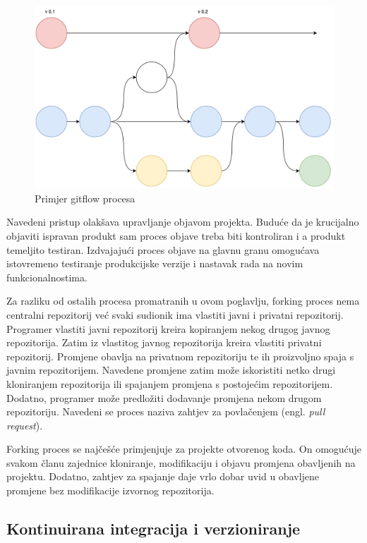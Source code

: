 \documentclass[times, utf8, diplomski, numeric]{fer}
\newcommand{\eng}[1]{(engl. \textit{#1})}
\begin{document}
\begin{figure}
    \centering
    \includegraphics[scale=0.5]{Gitflow}
    \caption{Primjer gitflow procesa}
    \label{fig:Gitflow}
\end{figure}

Navedeni pristup olakšava upravljanje objavom projekta. Buduće da je krucijalno objaviti ispravan produkt sam proces objave treba biti kontroliran i a produkt temeljito testiran. Izdvajajući proces objave na glavnu granu omogućava istovremeno testiranje produkcijske verzije i nastavak rada na novim funkcionalnostima.

Za razliku od ostalih procesa promatranih u ovom poglavlju, forking proces nema centralni repozitorij već svaki sudionik ima vlastiti javni i privatni repozitorij. Programer vlastiti javni repozitorij kreira kopiranjem nekog drugog javnog repozitorija. Zatim iz vlastitog javnog repozitorija kreira vlastiti privatni repozitorij. Promjene obavlja na privatnom repozitoriju te ih proizvoljno spaja s javnim repozitorijem. Navedene promjene zatim može iskoristiti netko drugi kloniranjem repozitorija ili spajanjem promjena s postojećim repozitorijem. Dodatno, programer može predložiti dodavanje promjena nekom drugom repozitoriju. Navedeni se proces naziva zahtjev za povlačenjem \eng{pull request}.

Forking proces se najčešće primjenjuje za projekte otvorenog koda. On omogućuje svakom članu zajednice kloniranje, modifikaciju i objavu promjena obavljenih na projektu. Dodatno, zahtjev za spajanje daje vrlo dobar uvid u obavljene promjene bez modifikacije izvornog repozitorija.

\subsection{Kontinuirana integracija i verzioniranje}
\end{document}
